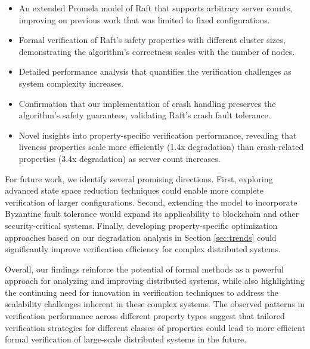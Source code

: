 \documentclass[a4paper]{llncs}
\begin{document}
    \begin{itemize}
        \item An extended Promela model of Raft that supports arbitrary server counts, improving on previous work \cite{Qx1} that was limited to fixed configurations.
        
        \item Formal verification of Raft's safety properties with different cluster sizes, demonstrating the algorithm's correctness scales with the number of nodes.
        
        \item Detailed performance analysis that quantifies the verification challenges as system complexity increases.
        
        \item Confirmation that our implementation of crash handling preserves the algorithm's safety guarantees, validating Raft's crash fault tolerance.
        
        \item Novel insights into property-specific verification performance, revealing that liveness properties scale more efficiently (1.4x degradation) than crash-related properties (3.4x degradation) as server count increases.
    \end{itemize}
    
    For future work, we identify several promising directions. First, exploring advanced state space reduction techniques could enable more complete verification of larger configurations. Second, extending the model to incorporate Byzantine fault tolerance \cite{Qx6, Qx8, Castro} would expand its applicability to blockchain and other security-critical systems. Finally, developing property-specific optimization approaches based on our degradation analysis in Section \ref{sec:trends} could significantly improve verification efficiency for complex distributed systems.
    
    Overall, our findings reinforce the potential of formal methods as a powerful approach for analyzing and improving distributed systems, while also highlighting the continuing need for innovation in verification techniques to address the scalability challenges inherent in these complex systems. The observed patterns in verification performance across different property types suggest that tailored verification strategies for different classes of properties could lead to more efficient formal verification of large-scale distributed systems in the future.
    
\end{document}
